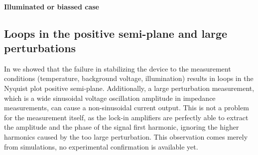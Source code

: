 \paragraph{Illuminated or biassed case}








\subsection{Loops in the positive semi-plane and large perturbations}\label{impedance-large_perturbations}
In  we showed that the failure in stabilizing the device to the measurement conditions (temperature, background voltage, illumination) results in loops in the Nyquist plot positive semi-plane.
Additionally, a large perturbation measurement, which is a wide sinusoidal voltage oscillation amplitude in impedance measurements, can cause a non-sinusoidal current output.
This is not a problem for the measurement itself, as the lock-in amplifiers are perfectly able to extract the amplitude and the phase of the signal first harmonic, ignoring the higher harmonics caused by the too large perturbation.
This observation comes merely from simulations, no experimental confirmation is available yet.

\begin{figure}
\end{figure}


